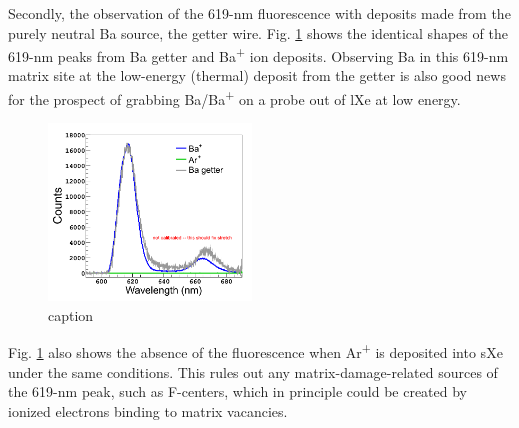 \documentclass[aps,pra,reprint,superscriptaddress]{revtex4-1}
\begin{document}
Secondly, the observation of the 619-nm fluorescence with deposits made from the purely neutral Ba source, the getter wire.  Fig. \ref{fig:ion_getter_ar} shows the identical shapes of the 619-nm peaks from Ba getter and Ba\textsuperscript{+} ion deposits.  Observing Ba in this 619-nm matrix site at the low-energy (thermal) deposit from the getter is also good news for the prospect of grabbing Ba/Ba\textsuperscript{+} on a probe out of lXe at low energy.

\begin{figure}
\includegraphics[width=0.48\textwidth]{figures/getter_ion_Ar.png}
\caption{caption}
\label{fig:ion_getter_ar}
\end{figure}

Fig. \ref{fig:ion_getter_ar} also shows the absence of the fluorescence when Ar\textsuperscript{+} is deposited into sXe under the same conditions.  This rules out any matrix-damage-related sources of the 619-nm peak, such as F-centers, which in principle could be created by ionized electrons binding to matrix vacancies.  
\end{document}
